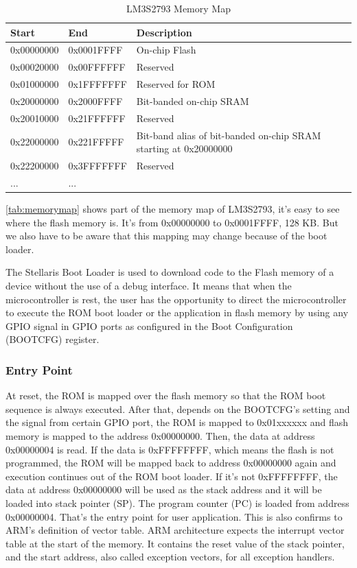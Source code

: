 \begin{center}
	\begin{table}
		\begin{tabular}{|p{1.6cm} p{1.6cm} p{4cm}|} 
			\hline
			Start & End & Description \\ [0.5ex] 
			\hline\hline
			0x00000000 & 0x0001FFFF & On-chip Flash \\ 
			\hline
			0x00020000 & 0x00FFFFFF & Reserved \\
			\hline
			0x01000000 & 0x1FFFFFFF & Reserved for ROM \\
			\hline
			0x20000000 & 0x2000FFFF & Bit-banded on-chip SRAM \\
			\hline
			0x20010000 & 0x21FFFFFF & Reserved \\
			\hline
			0x22000000 & 0x221FFFFF & Bit-band alias of bit-banded on-chip SRAM starting at 0x20000000 \\
			\hline
			0x22200000 & 0x3FFFFFFF & Reserved \\
			\hline
			... & ... &   \\ [1ex] 
			\hline
		\end{tabular}
		\caption{LM3S2793 Memory Map}
		\label{tab:memorymap}
	\end{table}
\end{center}

\autoref{tab:memorymap} shows part of the memory map of LM3S2793, it's easy to see where the flash memory is. It's from 0x00000000 to 0x0001FFFF, 128 KB. But we also have to be aware that this mapping may change because of the boot loader.

The Stellaris Boot Loader is used to download code to the Flash memory of a device without the use of a debug interface. It means that when the microcontroller is rest, the user has the opportunity to direct the microcontroller to execute the ROM boot loader or the application in flash memory by using any GPIO signal in GPIO ports as configured in the Boot Configuration (BOOTCFG) register.


\subsubsection{Entry Point}
At reset, the ROM is mapped over the flash memory so that the ROM boot sequence is always executed. After that, depends on the BOOTCFG's setting and the signal from certain GPIO port, the ROM is mapped to 0x01xxxxxx and flash memory is mapped to the address 0x00000000. Then, the data at address 0x00000004 is read. If the data is 0xFFFFFFFF, which means the flash is not programmed, the ROM will be mapped back to address 0x00000000 again and execution continues out of the ROM boot loader. If it's not 0xFFFFFFFF, the data at address 0x00000000 will be used as the stack address and it will be loaded into stack pointer (SP). The program counter (PC) is loaded from address 0x00000004. That's the entry point for user application. This is also confirms to ARM's definition of vector table. ARM architecture expects the interrupt vector table at the start of the memory. It contains the reset value of the stack pointer, and the start address, also called exception vectors, for all exception handlers.  

